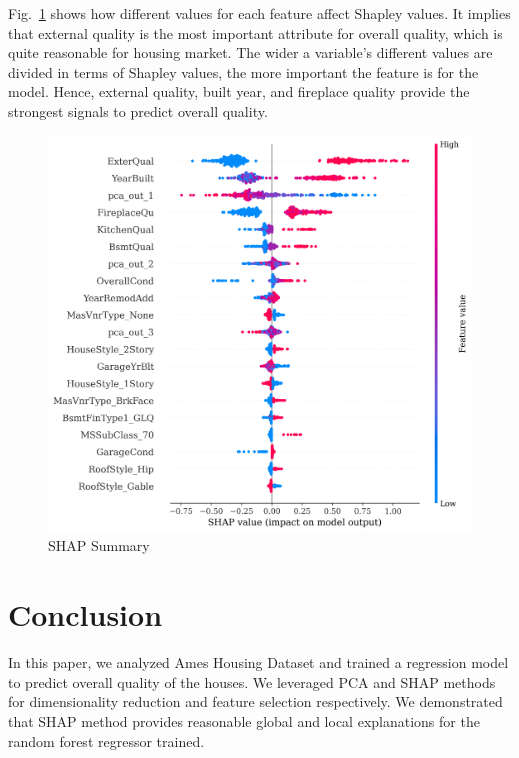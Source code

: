 \documentclass[conference]{IEEEtran}
\begin{document}
Fig.~\ref{fig:shap-summary} shows how different values for each feature affect Shapley values. 
It implies that external quality is the most important attribute 
for overall quality, which is quite reasonable for housing market. The wider a variable's
different values are divided in terms of Shapley values, the more important the feature
is for the model. Hence, external quality, built year, and fireplace quality provide
the strongest signals to predict overall quality.
\begin{figure}[htbp]
    \centerline{\includegraphics[width = 0.5 \textwidth]{shap-summary.png}}
    \caption{SHAP Summary}
    \label{fig:shap-summary}
\end{figure}

\section{Conclusion}

In this paper, we analyzed Ames Housing Dataset and trained a regression model 
to predict overall quality of the houses. We leveraged PCA and SHAP methods
for dimensionality reduction and feature selection respectively. We demonstrated that
SHAP method provides reasonable global and local explanations for the random forest
regressor trained.



\end{document}
